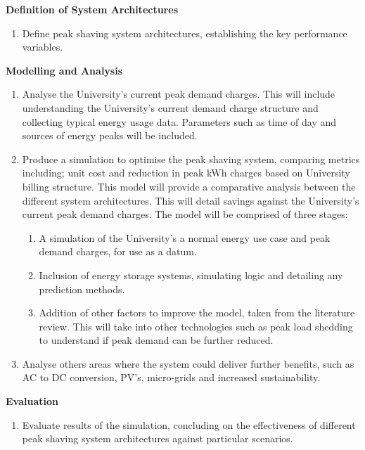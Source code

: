\textbf{Definition of System Architectures}

\begin{enumerate}[resume]
\item Define peak shaving system architectures, establishing the key performance variables.
\end{enumerate}

\textbf{Modelling and Analysis}

\begin{enumerate}[resume]
\item Analyse the University’s current peak demand charges. This will include understanding the University’s current demand charge structure and collecting typical energy usage data. Parameters such as time of day and sources of energy peaks will be included.
\item Produce a simulation to optimise the peak shaving system, comparing metrics including; unit cost and reduction in peak kWh charges based on University billing structure. This model will provide a comparative analysis between the different system architectures. This will detail savings against the University’s current peak demand charges. The model will be comprised of three stages:
\begin{enumerate}
\item A simulation of the University's a normal energy use case and peak demand charges, for use as a datum.
\item Inclusion of energy storage systems, simulating logic and detailing any prediction methods.
\item Addition of other factors to improve the model, taken from the literature review. This will take into other technologies such as peak load shedding to understand if peak demand can be further reduced.
\end{enumerate}
\item Analyse others areas where the system could deliver further benefits, such as AC to DC conversion, PV’s, micro-grids and increased sustainability.
\end{enumerate}

\textbf{Evaluation}

\begin{enumerate}[resume]
\item Evaluate results of the simulation, concluding on the effectiveness of different peak shaving system architectures against particular scenarios.
\end{enumerate}

